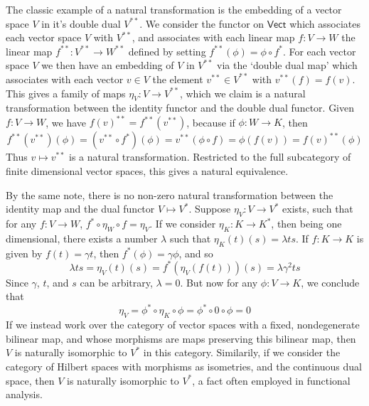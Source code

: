 \begin{example}
    The classic example of a natural transformation is the embedding of a vector space $V$ in it's double dual $V^{**}$. We consider the functor on $\mathsf{Vect}$ which associates each vector space $V$ with $V^{**}$, and associates with each linear map $f: V \to W$ the linear map $f^{**}: V^{**} \to W^{**}$ defined by setting $f^{**}(\phi) = \phi \circ f^*$. For each vector space $V$ we then have an embedding of $V$ in $V^{**}$ via the `double dual map' which associates with each vector $v \in V$ the element $v^{**} \in V^{**}$ with $v^{**}(f) = f(v)$. This gives a family of maps $\eta_V: V \to V^{**}$, which we claim is a natural transformation between the identity functor and the double dual functor. Given $f: V \to W$, we have $f(v)^{**} = f^{**}(v^{**})$, because if $\phi: W \to K$, then
    \[ f^{**}(v^{**})(\phi) = (v^{**} \circ f^*)(\phi) = v^{**}(\phi \circ f) = \phi(f(v)) = f(v)^{**}(\phi) \]
    Thus $v \mapsto v^{**}$ is a natural transformation. Restricted to the full subcategory of finite dimensional vector spaces, this gives a natural equivalence.
\end{example}

\begin{example}
    By the same note, there is no non-zero natural transformation between the identity map and the dual functor $V \mapsto V^*$. Suppose $\eta_V: V \to V^*$ exists, such that for any $f: V \to W$, $f^* \circ \eta_W \circ f = \eta_V$. If we consider $\eta_K: K \to K^*$, then being one dimensional, there exists a number $\lambda$ such that $\eta_K(t)(s) = \lambda ts$. If $f: K \to K$ is given by $f(t) = \gamma t$, then $f^*(\phi) = \gamma \phi$, and so
    \[ \lambda ts = \eta_V(t)(s) = f^*(\eta_V(f(t)))(s) = \lambda \gamma^2 ts \]
    Since $\gamma$, $t$, and $s$ can be arbitrary, $\lambda = 0$. But now for any $\phi: V \to K$, we conclude that
    \[ \eta_V = \phi^* \circ \eta_K \circ \phi = \phi^* \circ 0 \circ \phi = 0 \]
    If we instead work over the category of vector spaces with a fixed, nondegenerate bilinear map, and whose morphisms are maps preserving this bilinear map, then $V$ is naturally isomorphic to $V^*$ in this category. Similarily, if we consider the category of Hilbert spaces with morphisms as isometries, and the continuous dual space, then $V$ is naturally isomorphic to $V^*$, a fact often employed in functional analysis.
\end{example}

